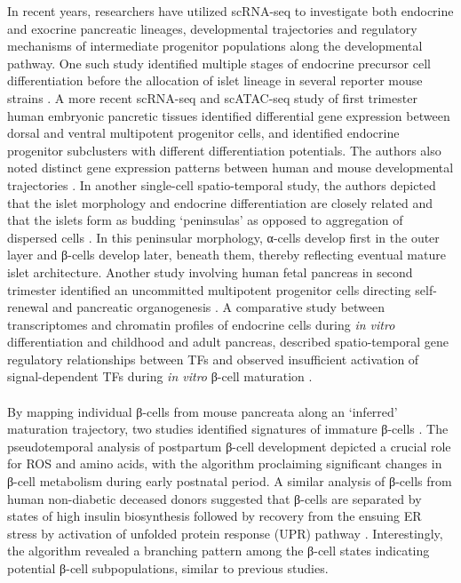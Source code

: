 In recent years, researchers have utilized scRNA-seq to investigate both endocrine and exocrine pancreatic lineages, developmental trajectories and regulatory mechanisms of intermediate progenitor populations along the developmental pathway. One such study identified multiple stages of endocrine precursor cell differentiation before the allocation of islet lineage in several reporter mouse strains \textbf{\cite{yu_defining_2019}}. A more recent scRNA-seq and scATAC-seq study of first trimester human embryonic pancretic tissues identified differential gene expression between dorsal and ventral multipotent progenitor cells, and identified endocrine progenitor subclusters with different differentiation potentials. The authors also noted distinct gene expression patterns between human and mouse developmental trajectories \textbf{\cite{ma_deciphering_2023}}. In another single-cell spatio-temporal study, the authors depicted that the islet morphology and endocrine differentiation are closely related and that the islets form as budding ‘peninsulas’ as opposed to aggregation of dispersed cells \textbf{\cite{sharon_peninsular_2019}}. In this peninsular morphology, α-cells develop first in the outer layer and β-cells develop later, beneath them, thereby reflecting eventual mature islet architecture. Another study involving human fetal pancreas in second trimester identified an uncommitted multipotent progenitor cells directing self-renewal and pancreatic organogenesis \textbf{\cite{villani_sox9ptf1a_2019}}. A comparative study between transcriptomes and chromatin profiles of endocrine cells during \textit{in vitro} differentiation and childhood and adult pancreas, described spatio-temporal gene regulatory relationships between TFs and observed insufficient activation of signal-dependent TFs during \textit{in vitro} β-cell maturation \textbf{\cite{zhu_understanding_2023}}.\\\\ 
By mapping individual β-cells from mouse pancreata along an ‘inferred’ maturation trajectory, two studies identified signatures of immature β-cells \textbf{\cite{qiu_deciphering_2017,zeng_pseudotemporal_2017}}. The pseudotemporal analysis of postpartum β-cell development depicted a crucial role for ROS and amino acids, with the algorithm proclaiming significant changes in β-cell metabolism during early postnatal period. A similar analysis of β-cells from human non-diabetic deceased donors suggested that β-cells are separated by states of high insulin biosynthesis followed by recovery from the ensuing ER stress by activation of unfolded protein response (UPR) pathway \textbf{\cite{xin_pseudotime_2018}}.  Interestingly, the algorithm revealed a branching pattern among the β-cell states indicating potential β-cell subpopulations, similar to previous studies.\\\\
